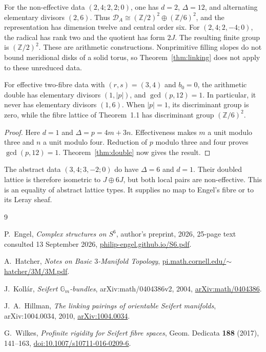 \documentclass[11pt]{article}
\numberwithin{equation}{section}
\begin{document}
For the non-effective data $(2,4;2,2;0)$, one has
$d=2$, $\Delta=12$, and alternating elementary divisors $(2,6)$.
Thus $\mathcal D_A\cong(\mathbb Z/2)^2\oplus(\mathbb Z/6)^2$,
and the representation has dimension twelve and central order six.
For $(2,4;2,-4;0)$, the radical has rank two and the quotient has
form $2J$.  The resulting finite group is $(\mathbb Z/2)^2$.
These are arithmetic constructions.  Nonprimitive filling slopes do
not bound meridional disks of a solid torus, so Theorem~\ref{thm:linking}
does not apply to these unreduced data.

\begin{proposition}\label{prop:separation}
For effective two-fibre data with $(r,s)=(3,4)$ and $b_0=0$, the
arithmetic double has elementary divisors $(1,|p|)$, and
$\gcd(p,12)=1$.  In particular, it never has elementary divisors
$(1,6)$.  When $|p|=1$, its discriminant group is zero, while the
fibre lattice of Theorem~1.1 has discriminant group $(\mathbb Z/6)^2$.
\end{proposition}

\begin{proof}
Here $d=1$ and $\Delta=p=4m+3n$.
Effectiveness makes $m$ a unit modulo three and $n$ a unit modulo four.
Reduction of $p$ modulo three and four proves $\gcd(p,12)=1$.
Theorem~\ref{thm:double} now gives the result.
\end{proof}

The abstract data $(3,4;3,-2;0)$ do have $\Delta=6$ and $d=1$.
Their doubled lattice is therefore isometric to $J\oplus6J$, but
both local pairs are non-effective.  This is an equality of abstract
lattice types.  It supplies no map to Engel's fibre or to its Leray sheaf.



\begin{thebibliography}{9}
\raggedright

P.~Engel,
\emph{Complex structures on $S^6$},
author's preprint, 2026, 25-page text consulted 13 September 2026,
\href{https://philip-engel.github.io/S6.pdf}{philip-engel.github.io/S6.pdf}.

A.~Hatcher,
\emph{Notes on Basic $3$-Manifold Topology},
\href{https://pi.math.cornell.edu/~hatcher/3M/3M.pdf}
{pi.math.cornell.edu/$\sim$hatcher/3M/3M.pdf}.

J.~Koll\'ar,
\emph{Seifert $\mathbb G_m$-bundles},
arXiv:math/0404386v2, 2004,
\href{https://arxiv.org/abs/math/0404386}{arXiv:math/0404386}.

J.~A.~Hillman,
\emph{The linking pairings of orientable Seifert manifolds},
arXiv:1004.0034, 2010,
\href{https://arxiv.org/abs/1004.0034}{arXiv:1004.0034}.

G.~Wilkes,
\emph{Profinite rigidity for Seifert fibre spaces},
Geom. Dedicata \textbf{188} (2017), 141--163,
\href{https://doi.org/10.1007/s10711-016-0209-6}
{doi:10.1007/s10711-016-0209-6}.

\end{thebibliography}
\end{document}
